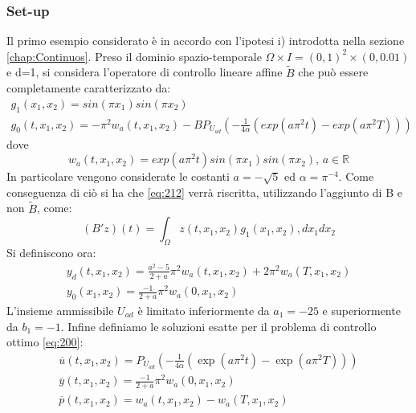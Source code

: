 \subsubsection{Set-up}
Il primo esempio considerato è in accordo con l'ipotesi i) introdotta nella sezione \ref{chap:Continuos}.
Preso il dominio spazio-temporale $\Omega \times I = (0,1)^2 \times (0,0.01)$ e d=1, si considera l'operatore di controllo lineare affine $\tilde{B}$ che può essere completamente caratterizzato da:
{\renewcommand\arraystretch{2}
\begin{equation}
\begin{array}{c}
g_1(x_1,x_2) = sin({\pi}x_1)sin({\pi}x_2)\\
g_0(t,x_1,x_2) = -{\pi}^2w_a(t,x_1,x_2) - BP_{U_{ad}} \left( -\frac{1}{4\alpha}(exp(a{\pi}^2t)-exp(a{\pi}^2T)) \right)
\end{array}
\label{eq:500}
\end{equation}
}
dove
\begin{equation}
w_a(t,x_1,x_2) = exp(a{\pi}^2t)sin({\pi}x_1)sin({\pi}x_2) \text{, } a \in \mathbb{R}
\label{eq:501}
\end{equation}
In particolare vengono considerate le costanti $a=-\sqrt{5}$ ed $\alpha={\pi}^{-4}$.
Come conseguenza di ciò si ha che \eqref{eq:212} verrà riscritta, utilizzando l'aggiunto di B e non $\tilde{B}$, come:
\begin{equation}
(B'z)(t) = \int_{\Omega} z(t,x_1,x_2)g_1(x_1,x_2) ,dx_1dx_2
\label{eq:502}
\end{equation}
Si definiscono ora:
{\renewcommand\arraystretch{2}
\begin{equation}
\begin{array}{c}
y_d(t,x_1,x_2) = \frac{a^2 - 5}{2 + a}{\pi}^2w_a(t,x_1,x_2) + 2{\pi}^2w_a(T,x_1,x_2) \\
y_0(x_1,x_2) = \frac{- 1}{2 + a}{\pi}^2w_a(0,x_1,x_2)
\end{array}
\label{eq:503}
\end{equation}
}
L'insieme ammissibile $U_{ad}$ è limitato inferiormente da $a_1=-25$ e superiormente da $b_1=-1$.
Infine definiamo le soluzioni esatte per il problema di controllo ottimo \ref{eq:200}:
{\renewcommand\arraystretch{2}
\begin{equation}
\begin{array}{c}
\overline{u}(t,x_1,x_2) = P_{U_{ad}} \left( -\frac{1}{4\alpha}(\exp(a{\pi}^2t)-\exp(a{\pi}^2T)) \right) \\
\overline{y}(t,x_1,x_2) = \frac{- 1}{2 + a}{\pi}^2w_a(0,x_1,x_2) \\
\overline{p}(t,x_1,x_2) = w_a(t,x_1,x_2) - w_a(T,x_1,x_2)
\end{array}
\label{eq:504}
\end{equation}
}

